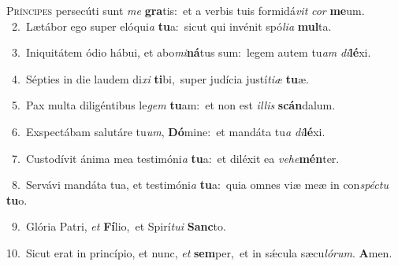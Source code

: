 \lettrine{\initial\textcolor{\initialcolor}{P}}{ríncipes} persecúti sunt \textit{me} \textbf{gra}\-tis:~\star et a verbis tuis formidá\textit{vit} \textit{cor} \textbf{me}\-um.\\
{\numbfont\textcolor{\numbcolor}{~2.}}~Lætábor ego super elóqui\textit{a} \textbf{tu}\-a:~\star sicut qui invénit spó\-\textit{li}\-\textit{a} \textbf{mul}\-ta.\par
{\numbfont\textcolor{\numbcolor}{~3.}}~Iniquitátem ódio hábui, et abo\-\textit{mi}\-\textbf{ná}tus sum:~\star legem autem tu\textit{am} \textit{di}\-\textbf{lé}xi.\par
{\numbfont\textcolor{\numbcolor}{~4.}}~Sépties in die laudem di\textit{xi} \textbf{ti}\-bi,~\star super judícia justí\-\textit{ti}\-\textit{æ} \textbf{tu}\-æ.\par
{\numbfont\textcolor{\numbcolor}{~5.}}~Pax multa diligéntibus le\textit{gem} \textbf{tu}\-am:~\star et non est \textit{il}\-\textit{lis} \textbf{scán}\-dalum.\par
{\numbfont\textcolor{\numbcolor}{~6.}}~Exspectábam salutáre tu\-\textit{um}\-, \textbf{Dó}\-mine:~\star et mandáta tu\textit{a} \textit{di}\-\textbf{lé}xi.\par
{\numbfont\textcolor{\numbcolor}{~7.}}~Custodívit ánima mea testimóni\textit{a} \textbf{tu}\-a:~\star et diléxit ea \textit{ve}\-\textit{he}\textbf{mén}ter.\par
{\numbfont\textcolor{\numbcolor}{~8.}}~Servávi mandáta tua, et testimóni\textit{a} \textbf{tu}\-a:~\star quia omnes viæ meæ in con\-\textit{spéc}\-\textit{tu} \textbf{tu}\-o.\par
{\numbfont\textcolor{\numbcolor}{~9.}}~Glória Patri, \textit{et} \textbf{Fí}\-lio,~\star et Spirí\-\textit{tu}\-\textit{i} \textbf{Sanc}\-to.\par
{\numbfont\textcolor{\numbcolor}{10.}}~Sicut erat in princípio, et nunc, \textit{et} \textbf{sem}\-per,~\star et in sǽcula sæcu\-\textit{ló}\-\textit{rum}. \textbf{A}\-men.\par
